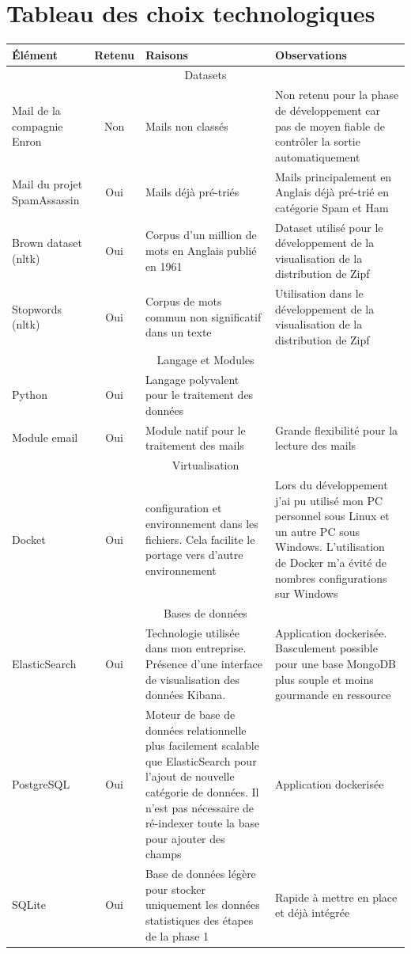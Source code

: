 \documentclass[a4paper,12pt]{article}
\begin{document}
\section{Tableau des choix technologiques}
	\begin{tabular}{|p{3cm}|c|p{4cm}|p{6cm}|}
		\hline
		Élément & Retenu & Raisons & Observations \\
		\hline
		
		\multicolumn{4}{|c|}{Datasets} \\
		\hline
		Mail de la compagnie Enron & Non & Mails non classés & Non retenu pour la phase de développement car pas de moyen fiable de contrôler la sortie automatiquement \\
		\hline
		Mail du projet SpamAssassin & Oui & Mails déjà pré-triés & Mails principalement en Anglais déjà pré-trié en catégorie Spam et Ham \\
		\hline
		Brown dataset (nltk) & Oui & Corpus d'un million de mots en Anglais publié en 1961 & Dataset utilisé pour le développement de la visualisation de la distribution de Zipf\\
		\hline
		Stopwords (nltk) & Oui & Corpus de mots commun non significatif dans un texte & Utilisation dans le développement de la visualisation de la distribution de Zipf\\
		\hline
		
		\multicolumn{4}{|c|}{Langage et Modules} \\
		\hline
		Python & Oui & Langage polyvalent pour le traitement des données & \\		
		\hline
		Module email & Oui & Module natif pour le traitement des mails & Grande flexibilité pour la lecture des mails \\
		\hline
		
		\multicolumn{4}{|c|}{Virtualisation} \\
		\hline
		Docket & Oui & configuration et environnement dans les fichiers. Cela facilite le portage vers d'autre environnement & Lors du développement j'ai pu utilisé mon PC personnel sous Linux et un autre PC sous Windows. L'utilisation de Docker m'a évité de nombres configurations sur Windows\\
		\hline
		
		\multicolumn{4}{|c|}{Bases de données} \\
		\hline
		ElasticSearch & Oui & Technologie utilisée dans mon entreprise. Présence d'une interface de visualisation des données Kibana. & Application dockerisée. Basculement possible pour une base MongoDB plus souple et moins gourmande en ressource \\
		\hline
		PostgreSQL & Oui & Moteur de base de données relationnelle plus facilement scalable que ElasticSearch pour l'ajout de nouvelle catégorie de données. Il n'est pas nécessaire de ré-indexer toute la base pour ajouter des champs & Application dockerisée\\
		\hline
		SQLite & Oui & Base de données légère pour stocker uniquement les données statistiques des étapes de la phase 1 & Rapide à mettre en place et déjà intégrée \\
		\hline		
		
		\hline
	\end{tabular}
	
\end{document}
